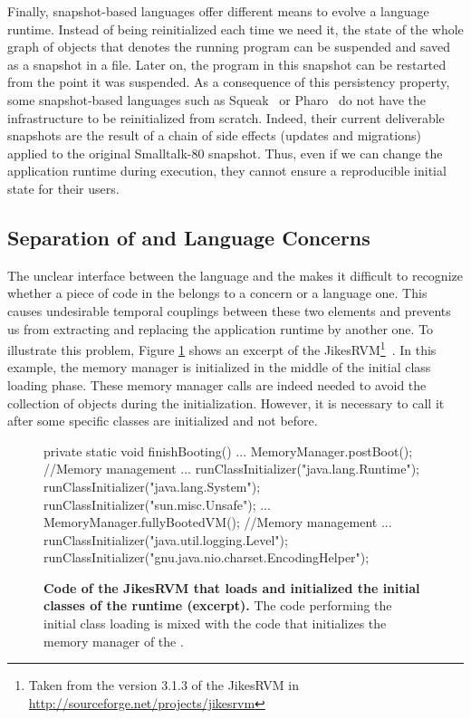 Finally, snapshot-based languages offer different means to evolve a language runtime. Instead of being reinitialized each time we need it, the state of the whole graph of objects that denotes the running program can be suspended and saved as a snapshot in a file. Later on, the program in this snapshot can be restarted from the point it was suspended. As a consequence of this persistency property, some snapshot-based languages such as Squeak~\cite{Inga97a} or Pharo~\cite{Blac09a} do not have the infrastructure to be reinitialized from scratch. Indeed, their current deliverable snapshots are the result of a chain of side effects (updates and migrations) applied to the original Smalltalk-80 snapshot. Thus, even if we can change the application runtime during execution, they cannot ensure a reproducible initial state for their users.

\subsection*{Separation of \VM and Language Concerns}

The unclear interface between the language and the \VM makes it difficult to recognize whether a piece of code in the \VM belongs to a \VM concern or a language one. This causes undesirable temporal couplings between these two elements and prevents us from extracting and replacing the application runtime by another one.
To illustrate this problem, Figure \ref{code:jikes_vm_initialization} shows an excerpt of the JikesRVM\footnote{Taken from the version 3.1.3 of the JikesRVM in \url{http://sourceforge.net/projects/jikesrvm}}~\cite{Alpe00a}. In this example, the memory manager is initialized in the middle of the initial class loading phase. These memory manager calls are indeed needed to avoid the collection of objects during the initialization. However, it is necessary to call it after some specific classes are initialized and not before.

\begin{figure}[ht]
\begin{code}
private static void finishBooting() {
    ...
    MemoryManager.postBoot(); //Memory management
    ...
    runClassInitializer("java.lang.Runtime");
    runClassInitializer("java.lang.System");
    runClassInitializer("sun.misc.Unsafe");
    ...
    MemoryManager.fullyBootedVM(); //Memory management
    ...
    runClassInitializer("java.util.logging.Level");
    runClassInitializer("gnu.java.nio.charset.EncodingHelper");
}
\end{code}
\caption{\textbf{Code of the JikesRVM that loads and initialized the initial classes of the runtime (excerpt).} The code performing the initial class loading is mixed with the code that initializes the memory manager of the \VM.\label{code:jikes_vm_initialization}}
\end{figure}

